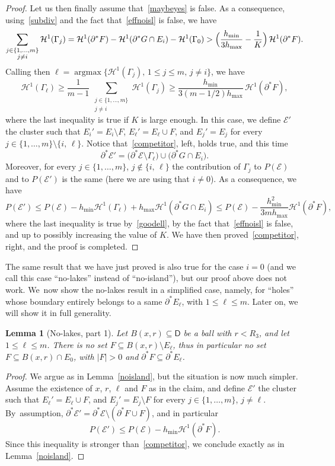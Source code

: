\documentclass[JEP,XML,SOM,Unicode,NoFloatCountersInSection]{cedram}
\DeclareMathOperator{\argmax}{argmax}
\newcommand\doppio[2]{\substack{#1\\#2}}
\newcommand\E{\mathcal{E}}
\renewcommand\H{\mathcal{H}}
\theoremstyle{plain}
\newtheorem{lem}[thm]{Lemma}
\theoremstyle{definition}
\begin{document}
\begin{proof}
Let us then finally assume that~\eqref{maybeyes} is false. As a consequence, using~\eqref{subdiv} and the fact that~\eqref{effnoisl} is false, we have
\[
\sum_{{\doppio{j\in \{1,\dots,m\}}{j\neq i}}} \H^1(\Gamma_j) = \H^1(\partial^* F) - \H^1(\partial^* G\cap E_i) - \H^1(\Gamma_0)
> \Bigl(\frac{h_{\min}}{3h_{\max}}- \frac 1K\Bigr)\, \H^1(\partial^* F).
\]
Calling then $\ell=\argmax \big\{\H^1(\Gamma_j),\, 1\leq j\leq m,\, j\neq i\big\}$, we have
\begin{equation}\label{goodell}
\H^1(\Gamma_\ell)\geq \frac 1 {m-1}\, \sum_{{\doppio{j\in \{1,\dots,m\}}{j\neq i}}} \H^1(\Gamma_j)
\geq \frac{h_{\min}}{3(m-1/2)h_{\max}}\, \H^1(\partial^* F),
\end{equation}
where the last inequality is true if $K$ is large enough. In this case, we define $\E'$ the cluster such that $E_i'=E_i\setminus F$, $E_\ell'=E_\ell\cup F$, and $E_j'=E_j$ for every $j \in \{1,\dots, m\}\setminus \{i,\, \ell\}$. Notice that~\eqref{competitor}, left, holds true, and this time
\[
\partial^* \E' = \big(\partial^* \E \setminus \Gamma_\ell\big) \cup \big(\partial^* G\cap E_i\big).
\]
Moreover, for every $j\in\{1,\dots,m\}$, $j\notin \{i,\,\ell\}$ the contribution of $\Gamma_j$ to $P(\E)$ and to $P(\E')$ is the same (here we are using that $i\neq 0$). As a consequence, we have
\[
P(\E') \leq P(\E) - h_{\min} \H^1(\Gamma_\ell) + h_{\max} \H^1(\partial^* G\cap E_i) \leq P(\E) - \frac{h_{\min}^2}{3mh_{\max}}\H^1(\partial^* F),
\]
where the last inequality is true by~\eqref{goodell}, by the fact that~\eqref{effnoisl} is false, and up to possibly increasing the value of $K$. We have then proved~\eqref{competitor}, right, and the proof is completed.
\end{proof}

The same result that we have just proved is also true for the case $i=0$ (and we call this case ``no-lakes'' instead of ``no-island''), but our proof above does not work. We~now show the no-lakes result in a simplified case, namely, for ``holes'' whose boundary entirely belongs to a same $\partial^* E_\ell$, with $1\leq \ell\leq m$. Later on, we will show it in full generality.

\begin{lem}[No-lakes, part 1]\label{nolakes}
Let $B(x,r)\subseteq \mathsf{D}$ be a ball with $r< R_3$, and let $1\leq \ell\leq m$. There is no set $F\subseteq B(x,r)\setminus E_\ell$, thus in particular no set $F\subseteq B(x,r)\cap E_0$, with $|F|>0$ and $\partial^* F \subseteq \partial^* E_\ell$.
\end{lem}
\begin{proof}
We argue as in Lemma~\ref{noisland}, but the situation is now much simpler. Assume the existence of $x$, $r$, $\ell$ and $F$ as in the claim, and define $\E'$ the cluster such that $E_\ell'=E_\ell\cup F$, and $E_j'=E_j\setminus F$ for every $j\in\{1,\dots,m\}$, $j\neq \ell$. By~as\-sump\-tion, $\partial^*\E'=\partial^*\E\setminus (\partial^*F\cup F)$, and in particular
\[
P(\E')\leq P(\E) - h_{\min} \H^1(\partial^* F).
\]
Since this inequality is stronger than~\eqref{competitor}, we conclude exactly as in Lemma~\ref{noisland}.
\end{proof}
\end{document}
